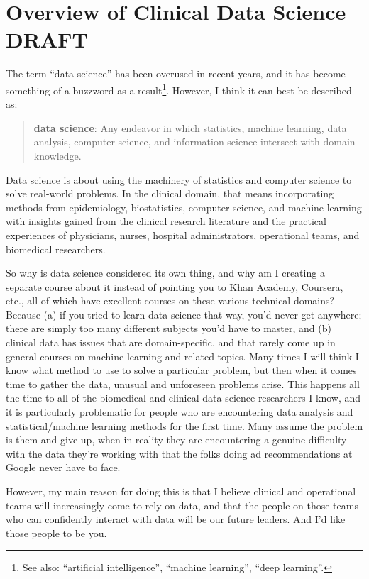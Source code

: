 \chapter{Overview of Clinical Data Science {\color{red} DRAFT} \label{chapter:overview}}

The term ``data science'' has been overused in recent years, and it has become something of a buzzword as a result\footnote{See also: ``artificial intelligence'', ``machine learning'', ``deep learning''.}. However, I think it can best be described as: 
\begin{quote}
\textbf{data science}: Any endeavor in which statistics, machine learning, data analysis, computer science, and information science intersect with domain knowledge.
\end{quote}
Data science is about using the machinery of statistics and computer science to solve real-world problems. In the clinical domain, that means incorporating methods from epidemiology, biostatistics, computer science, and machine learning with insights gained from the clinical research literature and the practical experiences of physicians, nurses, hospital administrators, operational teams, and biomedical researchers.

So why is data science considered its own thing, and why am I creating a separate course about it instead of pointing you to Khan Academy, Coursera, etc., all of which have excellent courses on these various technical domains? Because (a) if you tried to learn data science that way, you'd never get anywhere; there are simply too many different subjects you'd have to master, and (b) clinical data has issues that are domain-specific, and that rarely come up in general courses on machine learning and related topics. Many times I will think I know what method to use to solve a particular problem, but then when it comes time to gather the data, unusual and unforeseen problems arise. This happens all the time to all of the biomedical and clinical data science researchers I know, and it is particularly problematic for people who are encountering data analysis and statistical/machine learning methods for the first time. Many assume the problem is them and give up, when in reality they are encountering a genuine difficulty with the data they're working with that the folks doing ad recommendations at Google never have to face.

However, my main reason for doing this is that I believe clinical and operational teams will increasingly come to rely on data, and that the people on those teams who can confidently interact with data will be our future leaders. And I'd like those people to be you.

